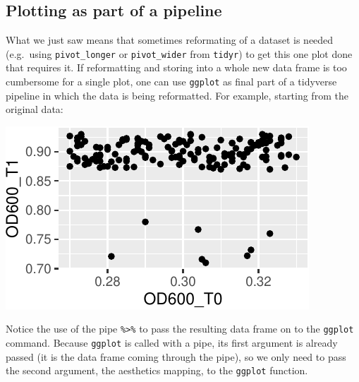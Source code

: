 \documentclass[]{book}
\newenvironment{Shaded}{}{}
\newcommand{\DataTypeTok}[1]{\textcolor[rgb]{0.56,0.13,0.00}{#1}}
\newcommand{\KeywordTok}[1]{\textcolor[rgb]{0.00,0.44,0.13}{\textbf{#1}}}
\newcommand{\NormalTok}[1]{#1}
\newcommand{\OperatorTok}[1]{\textcolor[rgb]{0.40,0.40,0.40}{#1}}
\newcommand{\StringTok}[1]{\textcolor[rgb]{0.25,0.44,0.63}{#1}}
\begin{document}
\hypertarget{plotting-as-part-of-a-pipeline}{%
\subsection{Plotting as part of a pipeline}\label{plotting-as-part-of-a-pipeline}}

What we just saw means that sometimes reformating of a dataset is needed (e.g.~using \texttt{pivot\_longer} or \texttt{pivot\_wider} from \texttt{tidyr}) to get this one plot done that requires it. If reformatting and storing into a whole new data frame is too cumbersome for a single plot, one can use \texttt{ggplot} as final part of a tidyverse pipeline in which the data is being reformatted. For example, starting from the original data:

\begin{Shaded}
\end{Shaded}

\begin{center}\includegraphics[width=\textwidth]{TRES-Tidy-Tutorial_files/figure-latex/unnamed-chunk-137-1} \end{center}

Notice the use of the pipe \texttt{\%\textgreater{}\%} to pass the resulting data frame on to the \texttt{ggplot} command. Because \texttt{ggplot} is called with a pipe, its first argument is already passed (it is the data frame coming through the pipe), so we only need to pass the second argument, the aesthetics mapping, to the \texttt{ggplot} function.
\end{document}
